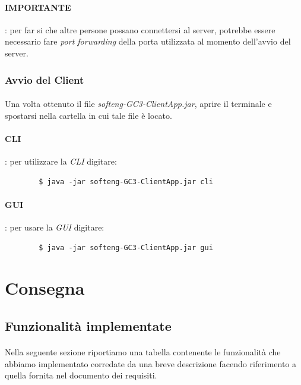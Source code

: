\documentclass[a4paper, 12pt]{article}
\begin{document}
	\paragraph{IMPORTANTE}: per far si che altre persone possano connettersi al server, potrebbe essere necessario fare \textit{port forwarding} della porta utilizzata al momento dell'avvio del server.
	
	\subsubsection{Avvio del Client}
	\paragraph{}
	Una volta ottenuto il file \textit{softeng-GC3-ClientApp.jar}, aprire il terminale e spostarsi nella cartella in cui tale file è locato.
	\paragraph{CLI}: per utilizzare la \textit{CLI} digitare:
	\begin{verbatim}
		$ java -jar softeng-GC3-ClientApp.jar cli
	\end{verbatim}
	\paragraph{GUI}: per usare la \textit{GUI} digitare:
	\begin{verbatim}
		$ java -jar softeng-GC3-ClientApp.jar gui
	\end{verbatim}
	
	\newpage
	\section{Consegna}
	\subsection{Funzionalità implementate}
	\paragraph{}
	Nella seguente sezione riportiamo una tabella contenente le funzionalità che abbiamo implementato corredate da una breve descrizione facendo riferimento a quella fornita nel documento dei requisiti.
	
\end{document}
